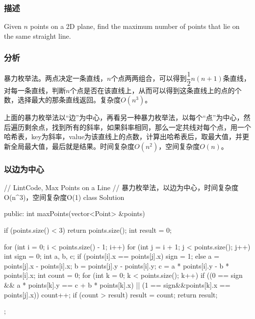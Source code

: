 \subsubsection{描述}
Given $n$ points on a 2D plane, find the maximum number of points that lie on the same straight line.


\subsubsection{分析}
暴力枚举法。两点决定一条直线，$n$个点两两组合，可以得到$\dfrac{1}{2}n(n+1)$条直线，对每一条直线，判断$n$个点是否在该直线上，从而可以得到这条直线上的点的个数，选择最大的那条直线返回。复杂度$O(n^3)$。

上面的暴力枚举法以“边”为中心，再看另一种暴力枚举法，以每个“点”为中心，然后遍历剩余点，找到所有的斜率，如果斜率相同，那么一定共线对每个点，用一个哈希表，key为斜率，value为该直线上的点数，计算出哈希表后，取最大值，并更新全局最大值，最后就是结果。时间复杂度$O(n^2)$，空间复杂度$O(n)$。


\subsubsection{以边为中心}
\begin{Code}
// LintCode, Max Points on a Line
// 暴力枚举法，以边为中心，时间复杂度O(n^3)，空间复杂度O(1)
class Solution {
public:
    int maxPoints(vector<Point> &points) {
        if (points.size() < 3) return points.size();
        int result = 0;

        for (int i = 0; i < points.size() - 1; i++) {
            for (int j = i + 1; j < points.size(); j++) {
                int sign = 0;
                int a, b, c;
                if (points[i].x == points[j].x) sign = 1;
                else {
                    a = points[j].x - points[i].x;
                    b = points[j].y - points[i].y;
                    c = a * points[i].y - b * points[i].x;
                }
                int count = 0;
                for (int k = 0; k < points.size(); k++) {
                    if ((0 == sign && a * points[k].y == c +  b * points[k].x) || 
                        (1 == sign&&points[k].x == points[j].x)) 
                        count++;
                }
                if (count > result) result = count;
            }
        }
        return result;
    }
};
\end{Code}


